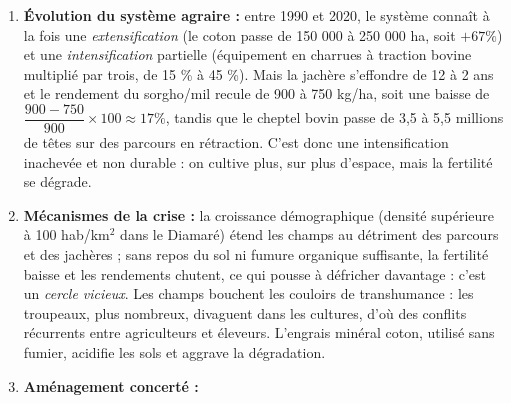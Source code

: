 \documentclass[11pt]{article}
\newcommand{\cle}[1]{{\popxbold\color{popdark}#1}}
\begin{document}
\begin{corrige}
\begin{enumerate}
\item \textbf{Évolution du système agraire :} entre 1990 et 2020, le système connaît à la fois une \emph{extensification} (le coton passe de 150 000 à 250 000 ha, soit $+67 \%$) et une \emph{intensification} partielle (équipement en charrues à traction bovine multiplié par trois, de 15 \% à 45 \%). Mais la jachère s'effondre de 12 à 2 ans et le rendement du sorgho/mil recule de 900 à 750 kg/ha, soit une baisse de $\dfrac{900-750}{900} \times 100 \approx {17} \%$, tandis que le cheptel bovin passe de 3,5 à 5,5 millions de têtes sur des parcours en rétraction. C'est donc une \cle{intensification inachevée et non durable} : on cultive plus, sur plus d'espace, mais la fertilité se dégrade.
\item \textbf{Mécanismes de la crise :} la croissance démographique (densité supérieure à 100 hab/km$^2$ dans le Diamaré) étend les champs au détriment des parcours et des jachères ; sans repos du sol ni fumure organique suffisante, la fertilité baisse et les rendements chutent, ce qui pousse à défricher davantage : c'est un \emph{cercle vicieux}. Les champs bouchent les couloirs de transhumance : les troupeaux, plus nombreux, divaguent dans les cultures, d'où des conflits récurrents entre agriculteurs et éleveurs. L'engrais minéral coton, utilisé sans fumier, acidifie les sols et aggrave la dégradation.
\item \textbf{Aménagement concerté :}
\begin{popfigure}
\end{popfigure}
\end{enumerate}
\end{corrige}
\end{document}
